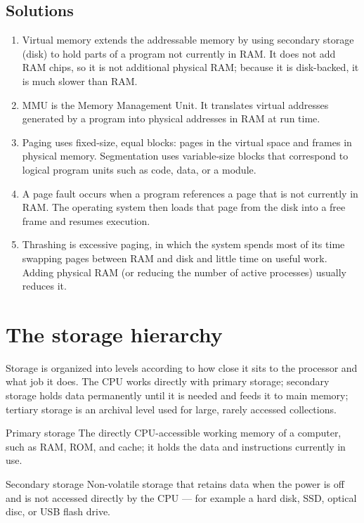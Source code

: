 \subsection*{Solutions}
\begingroup\small
\begin{enumerate}[label=\arabic*.]
  \item Virtual memory extends the addressable memory by using secondary
    storage (disk) to hold parts of a program not currently in RAM. It does not
    add RAM chips, so it is not additional physical RAM; because it is
    disk-backed, it is much slower than RAM.
  \item MMU is the Memory Management Unit. It translates virtual addresses
    generated by a program into physical addresses in RAM at run time.
  \item Paging uses fixed-size, equal blocks: pages in the virtual space and
    frames in physical memory. Segmentation uses variable-size blocks that
    correspond to logical program units such as code, data, or a module.
  \item A page fault occurs when a program references a page that is not
    currently in RAM. The operating system then loads that page from the disk
    into a free frame and resumes execution.
  \item Thrashing is excessive paging, in which the system spends most of its
    time swapping pages between RAM and disk and little time on useful work.
    Adding physical RAM (or reducing the number of active processes) usually
    reduces it.
\end{enumerate}
\endgroup

\section{The storage hierarchy}
Storage is organized into levels according to how close it sits to the
processor and what job it does. The CPU works directly with primary storage;
secondary storage holds data permanently until it is needed and feeds it to
main memory; tertiary storage is an archival level used for large, rarely
accessed collections.

\begin{definitionbox}{Primary storage}
The directly CPU-accessible working memory of a computer, such as RAM, ROM,
and cache; it holds the data and instructions currently in use.
\end{definitionbox}

\begin{definitionbox}{Secondary storage}
Non-volatile storage that retains data when the power is off and is not
accessed directly by the CPU --- for example a hard disk, SSD, optical disc,
or USB flash drive.
\end{definitionbox}

